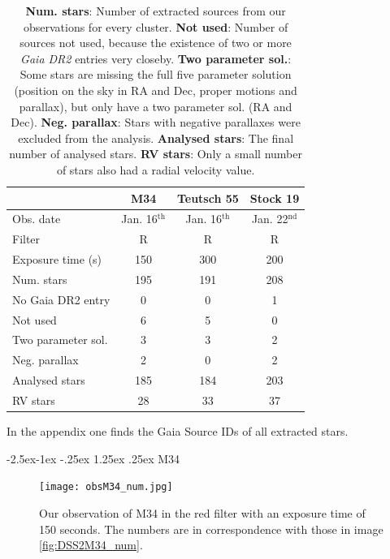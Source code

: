 \documentclass{article}
\makeatletter
\renewcommand\paragraph{\@startsection{paragraph}{4}{\z@}%
            {-2.5ex\@plus -1ex \@minus -.25ex}%
            {1.25ex \@plus .25ex}%
            {\normalfont\normalsize\bfseries}}
\makeatother
\begin{document}
\begin{table}[H]
\centering
\caption{\textbf{Num. stars}: Number of extracted sources from our observations for every cluster. \textbf{Not used}: Number of sources not used, because the existence of two or more \textit{Gaia DR2} entries very closeby. \textbf{Two parameter sol.}: Some stars are missing the full five parameter solution (position on the sky in RA and Dec, proper motions and parallax), but only have a two parameter sol. (RA and Dec). \textbf{Neg. parallax}: Stars with negative parallaxes were excluded from the analysis. \textbf{Analysed stars}: The final number of analysed stars. \textbf{RV stars}: Only a small number of stars also had a radial velocity value.}
\label{tab:sources}
\begin{tabular}{l|c|c|c}
                   & M34       & Teutsch 55 & Stock 19  \\ \hline
Obs. date          & Jan. 16$^{\text{th}}$ & Jan. 16$^{\text{th}}$  & Jan. 22$^{\text{nd}}$ \\
Filter             & R         & R          & R         \\
Exposure time (s)  & 150       & 300        & 200       \\ \hline
Num. stars         & 195       & 191        & 208       \\
No Gaia DR2 entry  & 0         & 0          & 1         \\
Not used           & 6         & 5          & 0         \\
Two parameter sol. & 3         & 3          & 2         \\
Neg. parallax      & 2         & 0          & 2         \\
Analysed stars     & 185       & 184        & 203       \\
RV stars           & 28        & 33         & 37       
\end{tabular}
\end{table}

In the appendix one finds the Gaia Source IDs of all extracted stars. 


\paragraph{M34}

\begin{figure}[H]
  \centering
    \texttt{[image: obsM34\_num.jpg]}
  \caption{Our observation of M34 in the red filter with an exposure time of 150 seconds. The numbers are in correspondence with those in image \ref{fig:DSS2M34_num}.}
  \label{fig:obsM34_num}
\end{figure}
\end{document}
